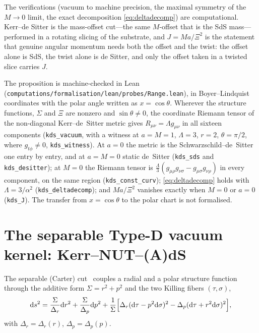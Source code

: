 \documentclass[11pt,a4paper]{article}
\theoremstyle{definition}
\newcommand{\dd}{\mathrm{d}}
\begin{document}
The verifications (vacuum to machine precision, the maximal symmetry of the $M\to0$ limit, the exact decomposition \eqref{eq:deltadecomp}) are computational. Kerr--de Sitter is the mass-offset cut---the same $M$-offset that is the SdS mass---performed in a rotating slicing of the substrate, and $J=Ma/\Xi^{2}$ is the statement that genuine angular momentum needs both the offset and the twist: the offset alone is SdS, the twist alone is de Sitter, and only the offset taken in a twisted slice carries $J$.

The proposition is machine-checked in Lean (\texttt{computations/formalisation/lean/probes/Range.lean}), in Boyer--Lindquist coordinates with the polar angle written as $x=\cos\theta$. Wherever the structure functions, $\Sigma$ and $\Xi$ are nonzero and $\sin\theta\neq0$, the coordinate Riemann tensor of the non-diagonal Kerr--de~Sitter metric gives $R_{\mu\nu}=\Lambda g_{\mu\nu}$ in all sixteen components (\texttt{kds\_vacuum}, with a witness at $a=M=1$, $\Lambda=3$, $r=2$, $\theta=\pi/2$, where $g_{t\phi}\neq0$, \texttt{kds\_witness}). At $a=0$ the metric is the Schwarzschild--de~Sitter one entry by entry, and at $a=M=0$ static de~Sitter (\texttt{kds\_sds} and \texttt{kds\_desitter}); at $M=0$ the Riemann tensor is $\tfrac{\Lambda}{3}(g_{\mu\rho}g_{\nu\sigma}-g_{\mu\sigma}g_{\nu\rho})$ in every component, on the same region (\texttt{kds\_const\_curv}); \eqref{eq:deltadecomp} holds with $\Lambda=3/\alpha^{2}$ (\texttt{kds\_deltadecomp}); and $Ma/\Xi^{2}$ vanishes exactly when $M=0$ or $a=0$ (\texttt{kds\_J}). The transfer from $x=\cos\theta$ to the polar chart is not formalised.

\section{The separable Type-D vacuum kernel: Kerr--NUT--(A)dS}\label{sec:pd}

The separable (Carter) cut~\cite{Carter1968} couples a radial and a polar structure function through the additive form $\Sigma=r^{2}+p^{2}$ and the two Killing fibers $(\tau,\sigma)$,
\begin{equation}\label{eq:carter}
\dd s^{2}=\frac{\Sigma}{\Delta_{r}}\dd r^{2}+\frac{\Sigma}{\Delta_{p}}\dd p^{2}
+\frac{1}{\Sigma}\Bigl[\Delta_{r}(\dd\tau-p^{2}\dd\sigma)^{2}-\Delta_{p}(\dd\tau+r^{2}\dd\sigma)^{2}\Bigr],
\end{equation}
with $\Delta_{r}=\Delta_{r}(r)$, $\Delta_{p}=\Delta_{p}(p)$.
\end{document}
